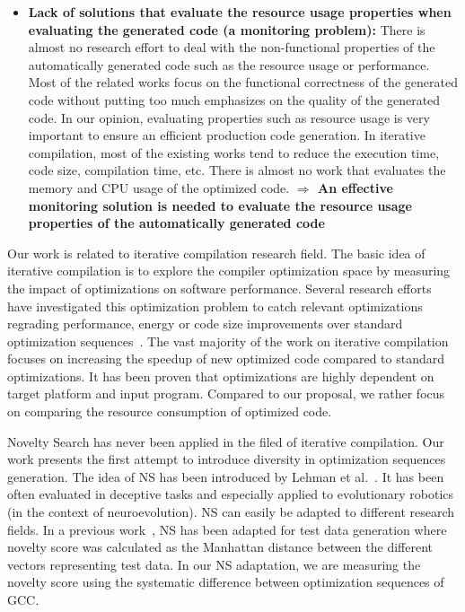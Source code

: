 \begin{itemize}
\item \textbf{Lack of solutions that evaluate the resource usage properties when evaluating the generated code (a monitoring problem):} There is almost no research effort to deal with the non-functional properties of the automatically generated code such as the resource usage or performance. Most of the related works focus on the functional correctness of the generated code without putting too much emphasizes on the quality of the generated code. In our opinion, evaluating properties such as resource usage is very important to ensure an efficient production code generation. In iterative compilation, most of the existing works tend to reduce the execution time, code size, compilation time, etc. There is almost no work that evaluates the memory and CPU usage of the optimized code.
\newline
\textbf{$\Rightarrow$ An effective monitoring solution is needed to evaluate the resource usage properties of the automatically generated code}
  
\end{itemize}
\iffalse
Our work is related to iterative compilation research field.
The basic idea of iterative compilation is to explore the compiler optimization space by measuring the impact of optimizations on software performance.
Several research efforts have investigated this optimization problem to catch relevant optimizations regrading performance, energy or code size improvements over standard optimization sequences~\cite{almagor2004finding,hoste2008cole,pan2006fast,zhong2009tuning,pallister2015identifying,chen2012deconstructing,sandran2012genetic,martins2014exploration,fursin2008milepost,lin2008automatic,schulte2014post}. 
The vast majority of the work on iterative compilation focuses on increasing the speedup of new optimized code compared to standard optimizations. 
It has been proven that optimizations are highly dependent on target platform and input program. Compared to our proposal, we rather focus on comparing the resource consumption of optimized code.

Novelty Search has never been applied in the filed of iterative compilation. Our work presents the first attempt to introduce diversity in optimization sequences generation. The idea of NS has been introduced by Lehman et al.~\cite{lehman2008exploiting}. It has been often evaluated in deceptive tasks and especially applied to evolutionary robotics~\cite{risi2010evolving,krvcah2012solving} (in the context of neuroevolution). 
NS can easily be adapted to different research fields. In a previous work~\cite{boussaa2015novelty}, NS has been adapted for test data generation where novelty score was calculated as the Manhattan distance between the different vectors representing test data.
In our NS adaptation, we are measuring the novelty score using the systematic difference between optimization sequences of GCC.

